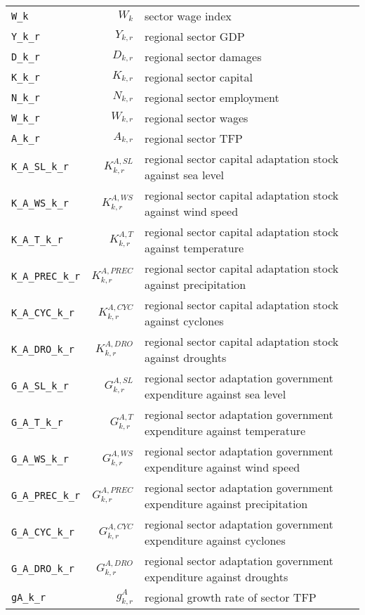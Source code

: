 \begin{center}
\begin{longtable}{lrl}
\texttt{W\_k} & ${W_k}$ & sector wage index\\
\texttt{Y\_k\_r} & ${Y_{k,r}}$ & regional sector GDP\\
\texttt{D\_k\_r} & ${D_{k,r}}$ & regional sector damages\\
\texttt{K\_k\_r} & ${K_{k,r}}$ & regional sector capital\\
\texttt{N\_k\_r} & ${N_{k,r}}$ & regional sector employment\\
\texttt{W\_k\_r} & ${W_{k,r}}$ & regional sector wages\\
\texttt{A\_k\_r} & ${A_{k,r}}$ & regional sector TFP\\
\texttt{K\_A\_SL\_k\_r} & ${K^{A,SL}_{k,r}}$ & regional sector capital adaptation stock against sea level\\
\texttt{K\_A\_WS\_k\_r} & ${K^{A,WS}_{k,r}}$ & regional sector capital adaptation stock against wind speed\\
\texttt{K\_A\_T\_k\_r} & ${K^{A,T}_{k,r}}$ & regional sector capital adaptation stock against temperature\\
\texttt{K\_A\_PREC\_k\_r} & ${K^{A,PREC}_{k,r}}$ & regional sector capital adaptation stock against precipitation\\
\texttt{K\_A\_CYC\_k\_r} & ${K^{A,CYC}_{k,r}}$ & regional sector capital adaptation stock against cyclones\\
\texttt{K\_A\_DRO\_k\_r} & ${K^{A,DRO}_{k,r}}$ & regional sector capital adaptation stock against droughts\\
\texttt{G\_A\_SL\_k\_r} & ${G^{A,SL}_{k,r}}$ & regional sector adaptation government expenditure against sea level\\
\texttt{G\_A\_T\_k\_r} & ${G^{A,T}_{k,r}}$ & regional sector adaptation government expenditure against temperature\\
\texttt{G\_A\_WS\_k\_r} & ${G^{A,WS}_{k,r}}$ & regional sector adaptation government expenditure against wind speed\\
\texttt{G\_A\_PREC\_k\_r} & ${G^{A,PREC}_{k,r}}$ & regional sector adaptation government expenditure against precipitation\\
\texttt{G\_A\_CYC\_k\_r} & ${G^{A,CYC}_{k,r}}$ & regional sector adaptation government expenditure against cyclones\\
\texttt{G\_A\_DRO\_k\_r} & ${G^{A,DRO}_{k,r}}$ & regional sector adaptation government expenditure against droughts\\
\texttt{gA\_k\_r} & ${g^{A}_{k,r}}$ & regional growth rate of sector TFP\\

\end{longtable}
\end{center}
